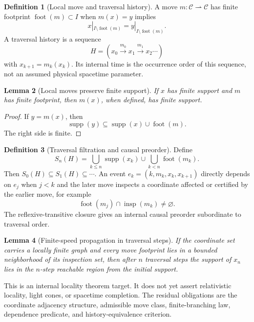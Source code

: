 \documentclass[11pt]{article}
\theoremstyle{definition}
\newtheorem{definition}{Definition}[section]
\theoremstyle{plain}
\newtheorem{lemma}[definition]{Lemma}
\theoremstyle{remark}
\begin{document}
\begin{definition}[Local move and traversal history]
A move \(m:\mathcal C\rightharpoonup\mathcal C\) has finite footprint
\(\operatorname{foot}(m)\subset I\) when \(m(x)=y\) implies
\[
x|_{I\setminus\operatorname{foot}(m)}
=
y|_{I\setminus\operatorname{foot}(m)}.
\]
A traversal history is a sequence
\[
H=(x_0\xrightarrow{m_0}x_1\xrightarrow{m_1}x_2\cdots)
\]
with \(x_{k+1}=m_k(x_k)\). Its internal time is the occurrence order of this
sequence, not an assumed physical spacetime parameter.
\end{definition}

\begin{lemma}[Local moves preserve finite support]
If \(x\) has finite support and \(m\) has finite footprint, then \(m(x)\),
when defined, has finite support.
\end{lemma}

\begin{proof}
If \(y=m(x)\), then
\[
\operatorname{supp}(y)\subseteq
\operatorname{supp}(x)\cup\operatorname{foot}(m).
\]
The right side is finite.
\end{proof}

\begin{definition}[Traversal filtration and causal preorder]
Define
\[
S_n(H)=
\bigcup_{k\le n}\operatorname{supp}(x_k)
\cup
\bigcup_{k<n}\operatorname{foot}(m_k).
\]
Then \(S_0(H)\subseteq S_1(H)\subseteq\cdots\). An event
\(e_k=(k,m_k,x_k,x_{k+1})\) directly depends on \(e_j\) when \(j<k\) and the
later move inspects a coordinate affected or certified by the earlier move,
for example
\[
\operatorname{foot}(m_j)\cap\operatorname{insp}(m_k)\neq\varnothing.
\]
The reflexive-transitive closure gives an internal causal preorder subordinate
to traversal order.
\end{definition}

\begin{lemma}[Finite-speed propagation in traversal steps]
If the coordinate set carries a locally finite graph and every move footprint
lies in a bounded neighborhood of its inspection set, then after \(n\)
traversal steps the support of \(x_n\) lies in the \(n\)-step reachable region
from the initial support.
\end{lemma}

This is an internal locality theorem target. It does not yet assert
relativistic locality, light cones, or spacetime completion. The residual
obligations are the coordinate adjacency structure, admissible move class,
finite-branching law, dependence predicate, and history-equivalence criterion.
\end{document}

